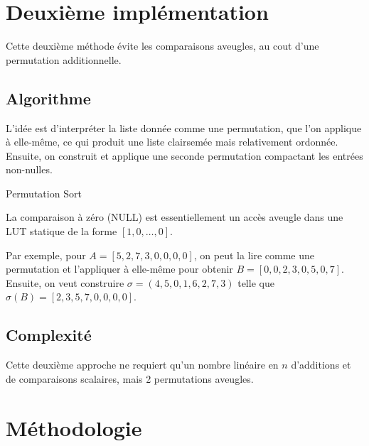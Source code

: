 \documentclass{article}
\begin{document}
\section{Deuxième implémentation}

Cette deuxième méthode évite les comparaisons aveugles, au cout d'une permutation additionnelle.

\subsection{Algorithme}

L'idée est d'interpréter la liste donnée comme une permutation, que l'on applique à elle-même, ce qui produit une liste clairsemée mais relativement ordonnée. Ensuite, on construit et applique une seconde permutation compactant les entrées non-nulles.

\begin{algorithm}
    \caption{Permutation Sort}
    \begin{algorithmic}
            \EndFor{}

        \EndFunction{}
    \end{algorithmic}
\end{algorithm}

La comparaison à zéro (NULL) est essentiellement un accès aveugle dans une LUT statique de la forme $[1, 0, \dots, 0]$.

Par exemple, pour $A = [5, 2, 7, 3, 0, 0, 0, 0]$, on peut la lire comme une permutation et l'appliquer à elle-même pour obtenir $B = [0, 0, 2, 3, 0, 5, 0, 7]$. Ensuite, on veut construire $\sigma = (4, 5, 0, 1, 6, 2, 7, 3)$ telle que $\sigma(B) = [2, 3, 5, 7, 0, 0, 0, 0]$.


\subsection{Complexité}

Cette deuxième approche ne requiert qu'un nombre linéaire en $n$ d'additions et de comparaisons scalaires, mais 2 permutations aveugles.

\section{Méthodologie}
\end{document}
